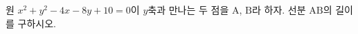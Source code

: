원 $x^2 + y^2 - 4x - 8y + 10 = 0$이 $y$축과 만나는 두 점을 $\mathrm{A}$, $\mathrm{B}$라 하자.
선분 $\mathrm{AB}$의 길이를 구하시오.
